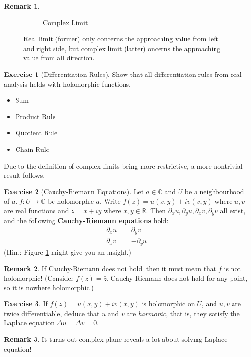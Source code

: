 \documentclass[a4paper, 12pt]{article}
\theoremstyle{definition}
\newtheorem{exercise}{Exercise}
\newtheorem{remark}{Remark}
\numberwithin{theorem}{section}
\numberwithin{definition}{section}
\numberwithin{exercise}{section}
\numberwithin{remark}{section}
\numberwithin{figure}{section}
\numberwithin{example}{section}
\newcommand{\R}{\mathbb{R}}
\newcommand{\C}{\mathbb{C}}
\begin{document}
\begin{remark}
\begin{figure}[tbp]
\begin{subfigure}[b]{0.5\textwidth}
            \caption{Complex Limit}
        \end{subfigure}
        \caption{Real limit (former) only concerns the approaching value from left and right side, but complex limit (latter) oncerns the approaching value from all direction.}
        \label{fig: Real and Complex Limit}
    \end{figure}
\end{remark}
\begin{exercise}[Differentiation Rules]
    Show that all differentiation rules from real analysis holds
    with holomorphic functions.
    \begin{itemize}
        \item Sum
        \item Product Rule
        \item Quotient Rule
        \item Chain Rule
    \end{itemize}
\end{exercise}
Due to the definition of complex limits being more restrictive,
a more nontrivial result follows.
\begin{exercise}[Cauchy-Riemann Equations]
    Let $a \in \C$ and $U$ be a neighbourhood of $a$.
    $f : U \rightarrow \C$ be holomorphic $a$.
    Write $f(z) = u(x,y) + i v(x,y)$ where $u,v$ are real functions
    and $z = x + iy$ where $x,y \in \R$.
    Then $\partial_x u, \partial_y u, \partial_x v, \partial_y v$ all exist,
    and the following \textbf{Cauchy-Riemann equations} hold:
    \begin{align*}
        \partial_x u &= \partial_y v \\
        \partial_x v &= - \partial_y u
    \end{align*}
(Hint: Figure \ref{fig: Real and Complex Limit} might give you an insight.)
\end{exercise}
\begin{remark}
    If Cauchy-Riemann does not hold, then it must mean that $f$ is not holomorphic! (Consider $f(z) = \bar{z}$. Cauchy-Riemann does not hold for any point, so it is nowhere holomorphic.)
\end{remark}
\begin{exercise}
    If $f(z) = u(x,y) + i v(x,y)$ is holomorphic on $U$,
    and $u,v$ are twice differentiable,
    deduce that $u$ and $v$ are \textit{harmonic}, that is,
    they satisfy the Laplace equation $\Delta u = \Delta v = 0$.
\end{exercise}
\begin{remark}
    It turns out complex plane reveals a lot about solving Laplace equation!
\end{remark}
\end{document}

